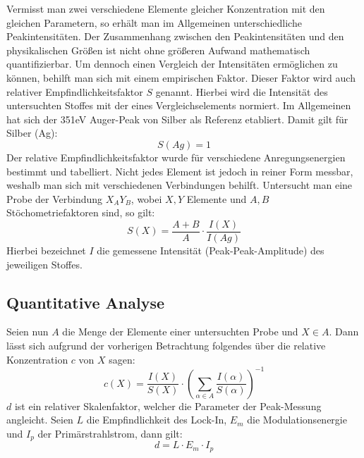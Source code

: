 	Vermisst man zwei verschiedene Elemente gleicher Konzentration mit den gleichen Parametern, so erhält man im Allgemeinen unterschiedliche Peakintensitäten. 
	Der Zusammenhang zwischen den Peakintensitäten und den physikalischen Größen ist nicht ohne größeren Aufwand mathematisch quantifizierbar.
	Um dennoch einen Vergleich der Intensitäten ermöglichen zu können, behilft man sich	mit einem empirischen Faktor.
	Dieser Faktor wird auch relativer Empfindlichkeitsfaktor $S$ genannt. 
	Hierbei wird die Intensität des untersuchten Stoffes mit der eines Vergleichselements normiert. 
	Im Allgemeinen hat sich der 351eV Auger-Peak von Silber als Referenz etabliert.
	Damit gilt für Silber (Ag):
	\[ 
		S(Ag) = 1 
	\]
	Der relative Empfindlichkeitsfaktor wurde für verschiedene Anregungsenergien bestimmt und tabelliert.
	Nicht jedes Element ist jedoch in reiner Form messbar, weshalb man sich mit verschiedenen Verbindungen behilft. 
	Untersucht man eine Probe der Verbindung $X_AY_B$, wobei $X,Y$ Elemente und $A,B$ Stöchometriefaktoren sind, so gilt:
	\[ 
		S(X) = \dfrac{A+B}{A}\cdot \dfrac{I(X)}{I(Ag)} 
	\]
	Hierbei bezeichnet $I$ die gemessene Intensität (Peak-Peak-Amplitude) des jeweiligen Stoffes. \cite{description}


\subsection{Quantitative Analyse} %
\label{sub:quantitative_analyse}

	Seien nun $A$ die Menge der Elemente einer untersuchten Probe und $X \in A$. 
	Dann lässt sich aufgrund der vorherigen Betrachtung folgendes über die relative Konzentration $c$ von $X$ sagen:
	\[
		c(X) = \dfrac{I(X)}{S(X)}\cdot\left( \sum_{\alpha \in A} \dfrac{I(\alpha)}{S(\alpha)} \right)^{-1}
	\]
	$d$ ist ein relativer Skalenfaktor, welcher die Parameter der Peak-Messung angleicht. 
	Seien $L$ die Empfindlichkeit des Lock-In, $E_m$ die Modulationsenergie und $I_p$ der Primärstrahlstrom, dann gilt:
	\[
		d = L\cdot E_m\cdot I_p
	\]

